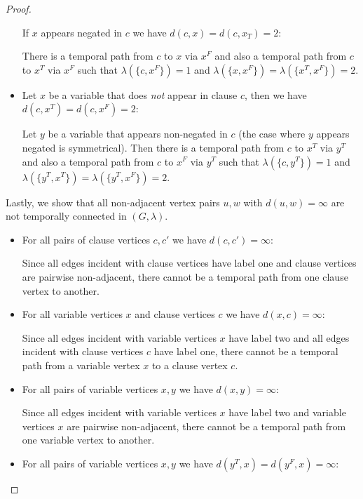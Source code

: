 \documentclass[11pt,a4paper]{article}
\theoremstyle{remark}
\theoremstyle{definition}
\begin{document}
\begin{proof}
\begin{itemize}
    If $x$ appears negated in $c$ we have $d(c,x)=d(c,x_T)=2$:

    There is a temporal path from $c$ to $x$ via $x^F$ and also a temporal path from $c$ to $x^T$ via $x^F$ such that $\lambda(\{c,x^F\})=1$ and $\lambda(\{x,x^F\})=\lambda(\{x^T,x^F\})=2$.
    \item Let $x$ be a variable that does \emph{not} appear in clause $c$, then we have $d(c,x^T)=d(c,x^F)=2$:

    Let $y$ be a variable that appears non-negated in $c$ (the case where $y$ appears negated is symmetrical). Then there is a temporal path from $c$ to $x^T$ via $y^T$ and also a temporal path from $c$ to $x^F$ via $y^T$ such that $\lambda(\{c,y^T\})=1$ and $\lambda(\{y^T,x^T\})=\lambda(\{y^T,x^F\})=2$.
\end{itemize}
Lastly, we show that all non-adjacent vertex pairs $u,w$ with $d(u,w)=\infty$ are not temporally connected in $(G,\lambda)$.
\begin{itemize}
\item For all pairs of clause vertices $c,c'$ we have $d(c,c')=\infty$: 

Since all edges incident with clause vertices have label one and clause vertices are pairwise non-adjacent, there cannot be a temporal path from one clause vertex to another.
\item For all variable vertices $x$ and clause vertices $c$ we have $d(x,c)=\infty$:

Since all edges incident with variable vertices $x$ have label two and all edges incident with clause vertices $c$ have label one, there cannot be a temporal path from a variable vertex $x$ to a clause vertex $c$.
\item For all pairs of variable vertices $x,y$ we have $d(x,y)=\infty$:

Since all edges incident with variable vertices $x$ have label two and variable vertices $x$ are pairwise non-adjacent, there cannot be a temporal path from one variable vertex to another.
\item For all pairs of variable vertices $x,y$ we have $d(y^T,x)=d(y^F,x)=\infty$:


\end{itemize}
\end{proof}
\end{document}
